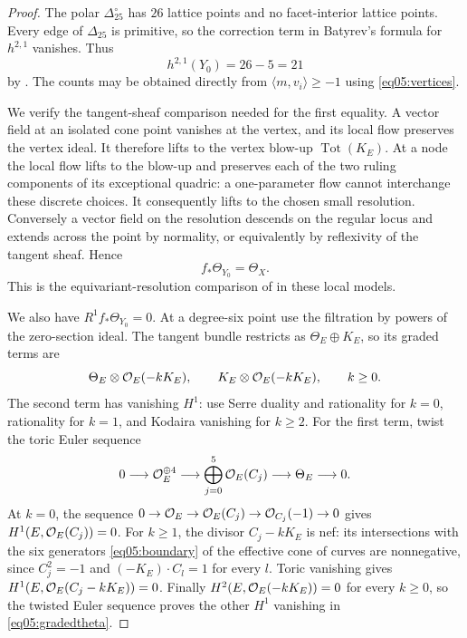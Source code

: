 \begin{proof}
The polar $\Delta_{25}^\circ$ has $26$ lattice points and no facet-interior lattice
points.  Every edge of $\Delta_{25}$ is primitive, so the correction term in
Batyrev's formula for $h^{2,1}$ vanishes.  Thus
\[
 h^{2,1}(Y_0)=26-5=21
\]
by \cite[Corollary~4.5.1]{Batyrev94}.  The counts may be obtained directly
from $\langle m,v_i\rangle\geq-1$ using \eqref{eq05:vertices}.

We verify the tangent-sheaf comparison needed for the first equality.
A vector field at an isolated cone point vanishes at the vertex, and
its local flow preserves the vertex ideal.  It therefore lifts to the
vertex blow-up $\operatorname{Tot}(K_E)$.  At a node the local flow lifts
to the blow-up and preserves each of the two ruling components of its
exceptional quadric: a one-parameter flow cannot interchange these
discrete choices.  It consequently lifts to the chosen small
resolution.  Conversely a vector field on the resolution descends on
the regular locus and extends across the point by normality, or
equivalently by reflexivity of the tangent sheaf.  Hence
\begin{equation}\label{eq05:pushforwardtheta}
 f_*\Theta_{Y_0}=\Theta_X.
\end{equation}
This is the equivariant-resolution comparison of
\cite[Definition~1.11 and Lemma~1.15]{FL22a} in these local models.

We also have $R^1f_*\Theta_{Y_0}=0$.  At a degree-six point use the
filtration by powers of the zero-section ideal.  The tangent bundle
restricts as $\Theta_E\oplus K_E$, so its graded terms are
\begin{equation}\label{eq05:gradedtheta}
 \Theta_E\otimes\mathcal{O}_E(-kK_E),\qquad
 K_E\otimes\mathcal{O}_E(-kK_E),\qquad k\geq0.
\end{equation}
The second term has vanishing $H^1$: use Serre duality and rationality
for $k=0$, rationality for $k=1$, and Kodaira vanishing for $k\geq2$.
For the first term, twist the toric Euler sequence
\[
 0\longrightarrow\mathcal{O}_E^{\oplus4}
 \longrightarrow\bigoplus_{j=0}^5\mathcal{O}_E(C_j)
 \longrightarrow\Theta_E\longrightarrow0.
\]
At $k=0$, the sequence
$0\to\mathcal{O}_E\to\mathcal{O}_E(C_j)\to\mathcal{O}_{C_j}(-1)\to0$ gives
$H^1(E,\mathcal{O}_E(C_j))=0$.  For $k\geq1$, the divisor $C_j-kK_E$ is nef:
its intersections with the six generators \eqref{eq05:boundary} of
the effective cone of curves are nonnegative, since $C_j^2=-1$ and
$(-K_E)\cdot C_l=1$ for every $l$.  Toric vanishing gives
$H^1(E,\mathcal{O}_E(C_j-kK_E))=0$.  Finally
$H^2(E,\mathcal{O}_E(-kK_E))=0$ for every $k\geq0$, so the twisted Euler
sequence proves the other $H^1$ vanishing in \eqref{eq05:gradedtheta}.


\end{proof}
